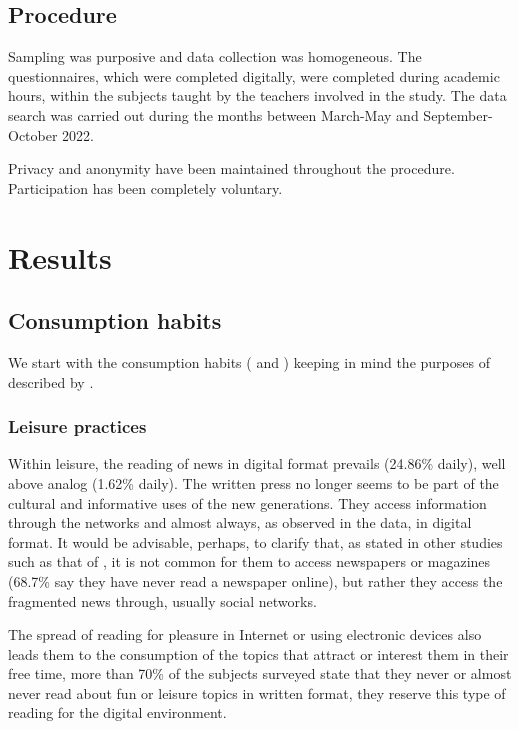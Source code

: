 \documentclass[english]{textolivre}
\begin{document}
\subsection{Procedure}
Sampling was purposive and data collection was homogeneous. The questionnaires, which were completed digitally, were completed during academic hours, within the subjects taught by the teachers involved in the study. The data search was carried out during the months between March-May and September-October 2022.

Privacy and anonymity have been maintained throughout the procedure. Participation has been completely voluntary.



\section{Results}

\subsection{Consumption habits}
We start with the consumption habits ( and ) keeping in mind the purposes of described by  \textcite{mckenna_reading_2012}.

\subsubsection{Leisure practices}
Within leisure, the reading of news in digital format prevails (24.86\% daily), well above analog (1.62\% daily). The written press no longer seems to be part of the cultural and informative uses of the new generations. They access information through the networks and almost always, as observed in the data, in digital format. It would be advisable, perhaps, to clarify that, as stated in other studies such as that of \textcite{tabernero_sala_habitos_2020}, it is not common for them to access newspapers or magazines (68.7\% say they have never read a newspaper online), but rather they access the fragmented news through, usually social networks.

The spread of reading for pleasure in Internet or using electronic devices also leads them to the consumption of the topics that attract or interest them in their free time, more than 70\% of the subjects surveyed state that they never or almost never read about fun or leisure topics in written format, they reserve this type of reading for the digital environment. 
\end{document}
